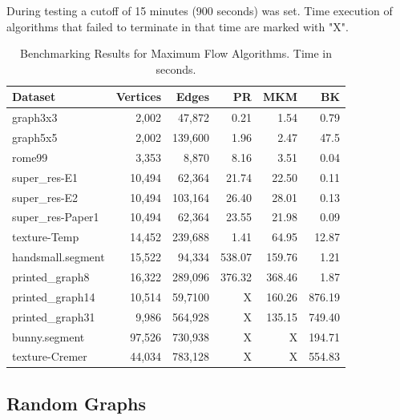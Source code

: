 During testing a cutoff of 15 minutes (900 seconds) was set. Time execution of algorithms that failed to terminate in that time are marked with "X".

\begin{table}[H]
\centering
\begin{tabular}{lrr|rrr}
\toprule
\textbf{Dataset} & \textbf{Vertices} & \textbf{Edges} & \textbf{PR} & \textbf{MKM} & \textbf{BK} \\
\midrule
graph3x3 & 2,002 & 47,872 & 0.21 & 1.54 & 0.79 \\
graph5x5 & 2,002 & 139,600 & 1.96 & 2.47 & 47.5 \\
rome99 & 3,353 & 8,870 & 8.16 & 3.51 & 0.04 \\
super\_res-E1 & 10,494 & 62,364 & 21.74 & 22.50 & 0.11 \\
super\_res-E2 & 10,494 & 103,164 & 26.40 & 28.01 & 0.13 \\
super\_res-Paper1 & 10,494 & 62,364 & 23.55 & 21.98 & 0.09 \\
texture-Temp & 14,452 & 239,688 & 1.41 & 64.95 & 12.87 \\
handsmall.segment & 15,522 & 94,334 & 538.07 & 159.76 & 1.21 \\
printed\_graph8 & 16,322 & 289,096 & 376.32 & 368.46 & 1.87 \\
printed\_graph14 & 10,514 & 59,7100 & X & 160.26 & 876.19 \\
printed\_graph31 & 9,986 & 564,928 & X & 135.15 & 749.40 \\
bunny.segment & 97,526 & 730,938 & X & X & 194.71 \\
texture-Cremer & 44,034 & 783,128 & X & X & 554.83 \\
\bottomrule
\end{tabular}
\caption{Benchmarking Results for Maximum Flow Algorithms. Time in seconds.}
\end{table}

\subsection{Random Graphs}

